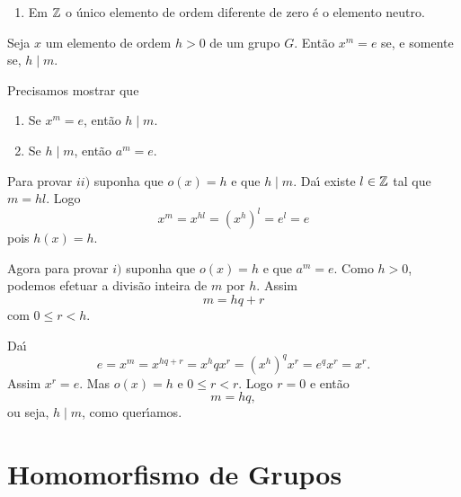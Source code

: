 \begin{exemplos}
\begin{enumerate}[label={\arabic*})]
\begin{itemize}
        	De modo semelhante chega-se \`a conclus\~ao que
        	\[
        		o(\overline{2}) = o(\overline{3}) = o(\overline{4}) = 5.
        	\]
        \end{itemize}

        \item Em $\mathbb{Z}$ o \'unico elemento de ordem diferente de zero \'e o elemento neutro.
    \end{enumerate}
\end{exemplos}

\begin{proposicao}
    Seja $x$ um elemento de ordem $h > 0$ de um grupo $G$. Ent\~ao $x^m = e$ se, e somente se, $h \mid m$.
\end{proposicao}
\begin{prova}
	Precisamos mostrar que
	\begin{enumerate}[label={\roman*})]
		\item Se $x^m = e$, ent\~ao $h \mid m$.

		\item Se $h \mid m$, ent\~ao $a^m = e$.
	\end{enumerate}

	Para provar $ii)$ suponha que $o(x) = h$ e que $h \mid m$. Da{\'\i} existe $l \in \mathbb{Z}$ tal que $m = hl$. Logo
	\[
		x^m = x^{hl} = (x^h)^l = e^l = e
	\]
	pois $h(x) = h$.

	Agora para provar $i)$ suponha que $o(x) = h$ e que $a^m = e$. Como $h > 0$, podemos efetuar a divis\~ao inteira de $m$ por $h$. Assim
	\[
		m = hq + r
	\]
	com $0 \le r < h$.

	Da{\'\i}
	\[
		e = x^m = x^{hq + r} = x^hqx^r = (x^h)^qx^r = e^qx^r = x^r.
	\]
	Assim $x^r = e$. Mas $o(x) = h$ e $0 \le r < r$. Logo $r = 0$ e ent\~ao
	\[
		m = hq,
	\]
	ou seja, $h \mid m$, como quer{\'\i}amos.
\end{prova}

\section{Homomorfismo de Grupos} %
\label{sec:homomorfismo_de_grupos}


